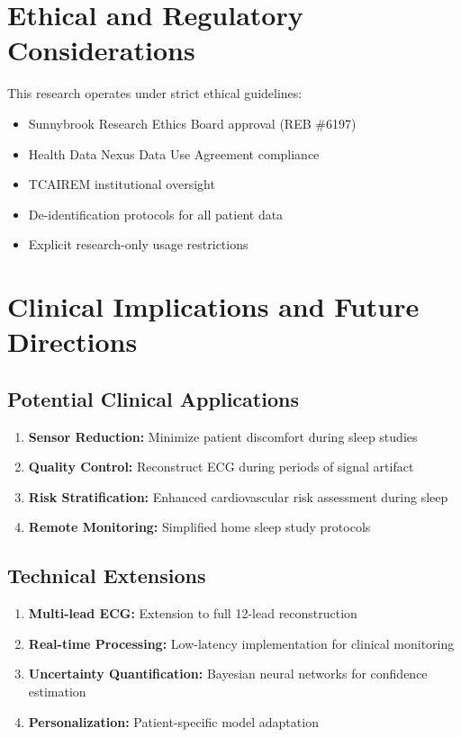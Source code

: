 \documentclass[11pt]{article}
\begin{document}
\section{Ethical and Regulatory Considerations}

This research operates under strict ethical guidelines:

\begin{itemize}
\item Sunnybrook Research Ethics Board approval (REB \#6197)
\item Health Data Nexus Data Use Agreement compliance
\item TCAIREM institutional oversight
\item De-identification protocols for all patient data
\item Explicit research-only usage restrictions
\end{itemize}

\section{Clinical Implications and Future Directions}

\subsection{Potential Clinical Applications}

\begin{enumerate}
\item \textbf{Sensor Reduction:} Minimize patient discomfort during sleep studies
\item \textbf{Quality Control:} Reconstruct ECG during periods of signal artifact
\item \textbf{Risk Stratification:} Enhanced cardiovascular risk assessment during sleep
\item \textbf{Remote Monitoring:} Simplified home sleep study protocols
\end{enumerate}

\subsection{Technical Extensions}

\begin{enumerate}
\item \textbf{Multi-lead ECG:} Extension to full 12-lead reconstruction
\item \textbf{Real-time Processing:} Low-latency implementation for clinical monitoring
\item \textbf{Uncertainty Quantification:} Bayesian neural networks for confidence estimation
\item \textbf{Personalization:} Patient-specific model adaptation
\end{enumerate}
\end{document}

